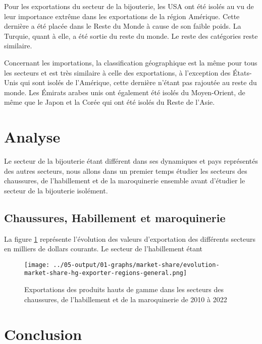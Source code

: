 \documentclass[french,10pt,a4paper]{article}
\begin{document}
Pour les exportations du secteur de la bijouterie, les USA ont été isolés au vu de leur importance extrême dans les exportations de la région \og Amérique\fg{}. Cette dernière a été placée dans le \og Reste du Monde\fg{} à cause de son faible poids. La \og Turquie\fg{}, quant à elle, a été sortie du \og reste du monde\fg{}. Le reste des catégories reste similaire.

Concernant les importations, la classification géographique est la même pour tous les secteurs et est très similaire à celle des exportations, à l'exception des États-Unis qui sont isolés de l'Amérique, cette dernière n'étant pas rajoutée au reste du monde. Les Émirats arabes unis ont également été isolés du Moyen-Orient, de même que le Japon et la Corée qui ont été isolés du \og Reste de l'Asie\fg{}. 


\section{Analyse}

Le secteur de la bijouterie étant différent dans ses dynamiques et pays représentés des autres secteurs, nous allons dans un premier temps étudier les secteurs des chaussures, de l'habillement et de la maroquinerie ensemble avant d'étudier le secteur de la bijouterie isolément. 

\subsection{Chaussures, Habillement et maroquinerie}

La figure \ref{fig:evolution-market-share-hg-exporter-regions-general} représente l'évolution des valeurs d'exportation des différents secteurs en milliers de dollars courants. Le secteur de l'habillement étant 



\begin{figure}[!h]
  \centering \texttt{[image: ../05-output/01-graphs/market-share/evolution-market-share-hg-exporter-regions-general.png]}
  \caption{Exportations des produits hauts de gamme dans les secteurs des chaussures, de l'habillement et de la maroquinerie de 2010 à 2022}
  \label{fig:evolution-market-share-hg-exporter-regions-general}
\end{figure}

\section{Conclusion}




\newpage


\end{document}
